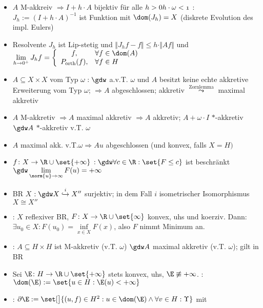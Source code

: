 \begin{itemize}
		\item $A$ M-akkreiv $\Rightarrow I+h\cdot A$ bijektiv für alle $h>0\mit h\cdot\omega<1$
		: $J_h:=(I+h\cdot A)^{-1}$ ist Funktion mit $\dom(J_h)=X$ (diskrete Evolution des impl. Eulers)
		\item Resolvente $J_h$ ist Lip-stetig und 
		$\big\Vert J_h f-f\big\Vert
			\leq
			h\cdot\Vert A f\Vert$ und
		$\lim\limits_{h\to 0^+}J_h f=
		\left\lbrace\begin{array}{cl}
			f, &\forall f\in\dom(A)\\
			P_{\text{orth}}(f), &\forall f\in H
		\end{array}\right.$
		\item $A\subseteq X\times X$  vom Typ $\omega:\gdw$ a.v.T. $\omega$  und $A$ besitzt keine echte akkretive Erweiterung vom Typ $\omega$; $\Rightarrow A$ abgeschlossen; akkretiv $\overset{\text{Zornlemma}}{\leadsto}$ maximal akkretiv
		\item $A$ M-akkretiv $\Rightarrow A$ maximal akkretiv $\Rightarrow A$ akkretiv; $A+\omega\cdot I$ $*$-akkretiv $\gdw A$ $*$-akkretiv v.T. $\omega$
		\item $A$ maximal akk. v.T.$\omega\Rightarrow Au$ abgeschlossen (und konvex, falls $X=H)$ %
 		\item $f\colon X\to\R\cup\set{+\infty}$  
 		$:\gdw\forall c\in\R:\set{F\leq c}$ ist beschränkt $\gdw\lim\limits_{\norm{u}\to\infty}F(u)=+\infty$
 		\item BR $X$  $:\gdw X\overset{i}{\hookrightarrow}X''$ surjektiv; in dem Fall $i$ isometrischer Isomorphismus $X\cong X''$
 		\item {}: $X$ reflexiver BR, $F\colon X\to\R\cup\set{\infty}$ konvex, uhs und koerziv. Dann:\\ $\exists u_0\in X:F(u_0)=\inf\limits_{x\in X} F(x)$, also $F$ nimmt Minimum an.
 		\item {}: $A\subseteq H\times H$ ist M-akkretiv (v.T. $\omega$) $\gdw A$ maximal akkretiv (v.T. $\omega$); gilt  in BR
 		\item Sei $\E\colon H\to\R\cup\set{+\infty}$ stets konvex, uhs, $\E\not\equiv+\infty$.
 		: $\dom(\E):=\set{u\in H:\E(u)<+\infty}$
 		\item {}: $\partial\E:=\set[\big]{(u,f)\in H^2:u\in\dom(\E)\wedge\forall v\in H:\Upsilon}$ mit\\

\end{itemize}
